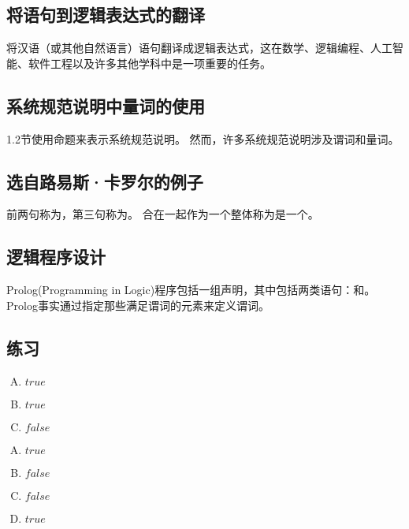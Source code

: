 {    \subsection{将语句到逻辑表达式的翻译}
    {
        将汉语（或其他自然语言）语句翻译成逻辑表达式，这在数学、逻辑编程、人工智能、软件工程以及许多其他学科中是一项重要的任务。
    }

    \subsection{系统规范说明中量词的使用}
    {
        1.2节使用命题来表示系统规范说明。
        然而，许多系统规范说明涉及谓词和量词。
    }

    \subsection{选自路易斯·卡罗尔的例子}
    {
        前两句称为，第三句称为。
        合在一起作为一个整体称为是一个。
    }

    \subsection{逻辑程序设计}
    {
        Prolog(Programming in Logic)程序包括一组声明，其中包括两类语句：和。
        Prolog事实通过指定那些满足谓词的元素来定义谓词。
    }

    \subsection{练习}
    {
        \begin{practices}
            \begin{enumerate}[A.]
                \item $true$
                \item $true$
                \item $false$
            \end{enumerate}
        \end{practices}

        \begin{practices}
            \begin{enumerate}[A.]
                \item $true$
                \item $false$
                \item $false$
                \item $true$
            \end{enumerate}
        \end{practices}

}}
